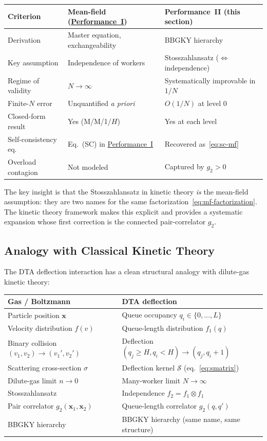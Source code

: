 \documentclass[11pt,a4paper]{article}
\newcommand{\fone}{f_1}
\newcommand{\ftwo}{f_2}
\newcommand{\gtwo}{g_2}
\newcommand{\cS}{\mathcal{S}}
\begin{document}
\begin{center}
\begin{tabular}{@{}lll@{}}
\toprule
Criterion & Mean-field (\hyperref[chap:load_balance]{Performance~I}) & Performance~II (this section) \\
\midrule
Derivation & Master equation, exchangeability & BBGKY hierarchy~\cite{gardiner2004} \\
Key assumption & Independence of workers & Stosszahlansatz ($\Leftrightarrow$ independence) \\
Regime of validity & $N \to \infty$ & Systematically improvable in $1/N$ \\
Finite-$N$ error & Unquantified \emph{a priori} & $O(1/N)$ at level 0 \\
Closed-form result & Yes (M/M/1/$H$) & Yes at each level \\
Self-consistency eq. & Eq.~(SC) in \hyperref[chap:load_balance]{Performance~I} & Recovered as~\eqref{eq:sc-mf} \\
Overload contagion & Not modeled & Captured by $\gtwo > 0$ \\
\bottomrule
\end{tabular}
\end{center}

The key insight is that the Stosszahlansatz in kinetic theory
\emph{is} the mean-field assumption: they are two names for
the same factorization~\eqref{eq:mf-factorization}.
The kinetic theory framework makes this explicit and provides a
systematic expansion whose first correction is the connected
pair-correlator $\gtwo$.

\subsection{Analogy with Classical Kinetic Theory}

The DTA deflection interaction has a clean structural analogy
with dilute-gas kinetic theory:

\medskip
\begin{center}
\begin{tabular}{@{}ll@{}}
\toprule
Gas / Boltzmann & DTA deflection \\
\midrule
Particle position $\mathbf{x}$ & Queue occupancy $q_i \in \{0,\ldots,L\}$ \\
Velocity distribution $f(v)$ & Queue-length distribution $\fone(q)$ \\
Binary collision $(v_1, v_2) \to (v_1', v_2')$ & Deflection $(q_j\geq H, q_i < H) \to (q_j, q_i+1)$ \\
Scattering cross-section $\sigma$ & Deflection kernel $\cS$ (eq.~\eqref{eq:smatrix}) \\
Dilute-gas limit $n \to 0$ & Many-worker limit $N \to \infty$ \\
Stosszahlansatz & Independence $\ftwo = \fone \otimes \fone$ \\
Pair correlator $g_2(\mathbf{x}_1, \mathbf{x}_2)$ & Queue-length correlator $\gtwo(q, q')$ \\
BBGKY hierarchy & BBGKY hierarchy (same name, same structure) \\
\bottomrule
\end{tabular}
\end{center}
\medskip
\end{document}
